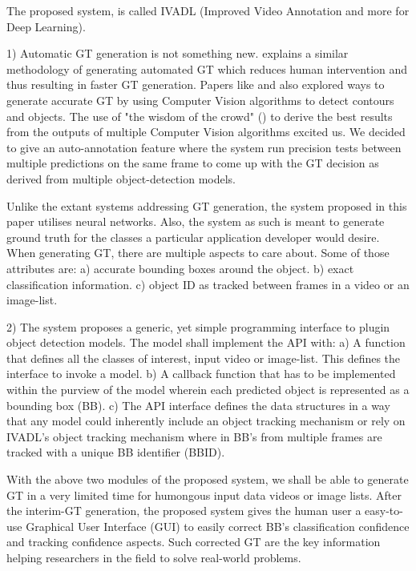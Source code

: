 \documentclass[conference]{IEEEtran}
\begin{document}
The proposed system, is called IVADL (Improved Video Annotation and more for Deep Learning).

1) Automatic GT generation is not something new. \cite{dominguez2014gtgencv} explains a similar methodology of generating automated GT which reduces human intervention and thus resulting in faster GT generation. Papers like \cite{comaschi2014gtgencv} and \cite{kavasidis2012gtgencv} also explored ways to generate accurate GT by using Computer Vision algorithms to detect contours and objects. The use of "the wisdom of the crowd" (\cite{dominguez2014gtgencv}) to derive the best results from the outputs of multiple Computer Vision algorithms excited us. We decided to give an auto-annotation feature where the system run precision tests between multiple predictions on the same frame to come up with the GT decision as derived from multiple object-detection models. \par
Unlike the extant systems addressing GT generation, the system proposed in this paper utilises neural networks. Also, the system as such is meant to generate ground truth for the classes a particular application developer would desire. When generating GT, there are multiple aspects to care about. Some of those attributes are:
a) accurate bounding boxes around the object.
b) exact classification information.
c) object ID as tracked between frames in a video or an image-list.

2) The system proposes a generic, yet simple programming interface to plugin object detection models. The model shall implement the API with:
a) A function that defines all the classes of interest, input video or image-list. This defines the interface to invoke a model.
b) A callback function that has to be implemented within the purview of the model wherein each predicted object is represented as a bounding box (BB).
c) The API interface defines the data structures in a way that any model could inherently include an object tracking mechanism or rely on IVADL's object tracking mechanism where in BB's from multiple frames are tracked with a unique BB identifier (BBID).

With the above two modules of the proposed system, we shall be able to generate GT in a very limited time for humongous input data videos or image lists. After the interim-GT generation, the proposed system gives the human user a easy-to-use Graphical User Interface (GUI) to easily correct BB's classification confidence and tracking confidence aspects. Such corrected GT are the key information helping researchers in the field to solve real-world problems. 
\end{document}
